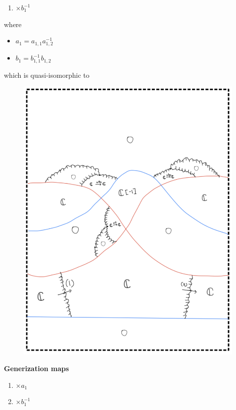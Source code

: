 \begin{enumerate}[label = (\roman*)]
\begin{enumerate}[label = (Step \arabic*)]
\begin{enumerate}[label = (\arabic*)]
\item $\times b_1^{-1}$
\end{enumerate}
where
\begin{itemize}
\item $a_1 = a_{1,1}a_{1,2}^{-1}$
\item $b_1 = b_{1,1}^{-1}b_{1,2}$
\end{itemize}

which is quasi-isomorphic to
\begin{figure}[H]
    \centering
    \includegraphics[scale = 0.95]{diagrams/cobord_gen/base_4.png}
    \caption{}
    \label{fig:your-label}
\end{figure}
\textbf{Generization maps}
\begin{enumerate}[label = (\arabic*)]
\item $\times a_1$

\item $\times b_1^{-1}$
\end{enumerate}


\end{enumerate}
\end{enumerate}

